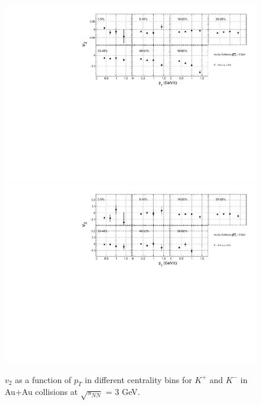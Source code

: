 \begin{figure}[h]
\includegraphics[scale=0.5]{chapter3/fig/v2ptpikp/v2pt_cent_kaonp.pdf}
\includegraphics[scale=0.5]{chapter3/fig/v2ptpikp/v2pt_cent_kaonm.pdf}
\caption{$v_{2}$ as a function of $p_{T}$ in different centrality bins for $K^{+}$ and $K^{-}$ in Au+Au collisions at $\sqrt{s_{NN}}$ = 3 GeV.}
\label{kaon_v2pt_cent}
\end{figure}

